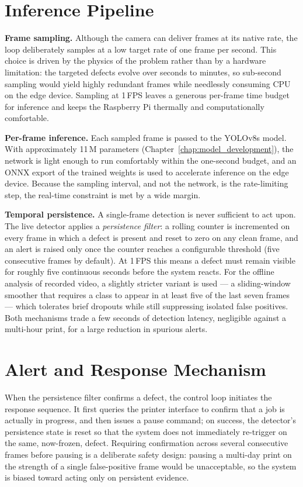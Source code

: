 \documentclass[english, Lau, oneside]{sapthesis}
\begin{document}
\section{Inference Pipeline}
\textbf{Frame sampling.} Although the camera can deliver frames at its native rate, the loop deliberately samples at a low target rate of one frame per second. This choice is driven by the physics of the problem rather than by a hardware limitation: the targeted defects evolve over seconds to minutes, so sub-second sampling would yield highly redundant frames while needlessly consuming CPU on the edge device. Sampling at 1\,FPS leaves a generous per-frame time budget for inference and keeps the Raspberry Pi thermally and computationally comfortable.

\textbf{Per-frame inference.} Each sampled frame is passed to the YOLOv8s model. With approximately 11\,M parameters (Chapter~\ref{chap:model_development}), the network is light enough to run comfortably within the one-second budget, and an ONNX export of the trained weights is used to accelerate inference on the edge device. Because the sampling interval, and not the network, is the rate-limiting step, the real-time constraint is met by a wide margin.

\textbf{Temporal persistence.} A single-frame detection is never sufficient to act upon. The live detector applies a \textit{persistence filter}: a rolling counter is incremented on every frame in which a defect is present and reset to zero on any clean frame, and an alert is raised only once the counter reaches a configurable threshold (five consecutive frames by default). At 1\,FPS this means a defect must remain visible for roughly five continuous seconds before the system reacts. For the offline analysis of recorded video, a slightly stricter variant is used --- a sliding-window smoother that requires a class to appear in at least five of the last seven frames --- which tolerates brief dropouts while still suppressing isolated false positives. Both mechanisms trade a few seconds of detection latency, negligible against a multi-hour print, for a large reduction in spurious alerts.

\section{Alert and Response Mechanism}
When the persistence filter confirms a defect, the control loop initiates the response sequence. It first queries the printer interface to confirm that a job is actually in progress, and then issues a pause command; on success, the detector's persistence state is reset so that the system does not immediately re-trigger on the same, now-frozen, defect. Requiring confirmation across several consecutive frames before pausing is a deliberate safety design: pausing a multi-day print on the strength of a single false-positive frame would be unacceptable, so the system is biased toward acting only on persistent evidence.
\end{document}
